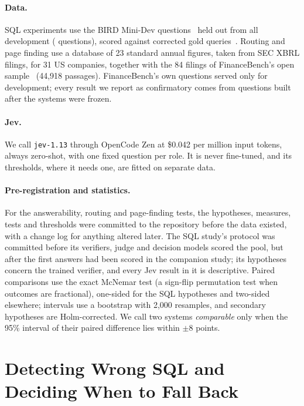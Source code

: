 \documentclass[runningheads,a4paper]{llncs}
\makeatletter
\newcommand{\N}[1]{\@ifundefined{pb@#1}{\textbf{??#1??}}{\csname pb@#1\endcsname}}
\makeatother
\begin{document}
\paragraph{Data.} SQL experiments use the BIRD Mini-Dev questions~\cite{li2023bird} held out from all development
(\N{sN} questions), scored against corrected gold queries~\cite{jin2026annotation}. Routing and page finding use a
database of 23 standard annual figures, taken from SEC XBRL filings, for 31 US companies, together with the 84
filings of FinanceBench's open sample~\cite{islam2023financebench} (44,918 passages). FinanceBench's own questions
served only for development; every result we report as confirmatory comes from questions built after the systems
were frozen.

\paragraph{Jev.} We call \texttt{jev-1.13} through OpenCode Zen at \$0.042 per million input tokens, always
zero-shot, with one fixed question per role. It is never fine-tuned, and its thresholds, where it needs one, are
fitted on separate data.

\paragraph{Pre-registration and statistics.} For the answerability, routing and page-finding tests, the hypotheses,
measures, tests and thresholds were committed to the repository before the data existed, with a change log for
anything altered later. The SQL study's protocol was committed before its verifiers, judge and decision models scored
the pool, but after the first answers had been scored in the companion study; its hypotheses concern the trained
verifier, and every Jev result in it is descriptive. Paired comparisons use the exact McNemar test (a sign-flip
permutation test when outcomes are fractional), one-sided for the SQL hypotheses and two-sided elsewhere; intervals
use a bootstrap with 2,000 resamples, and secondary hypotheses are Holm-corrected. We call two systems \emph{comparable}
only when the 95\% interval of their paired difference lies within $\pm$8 points.

\section{Detecting Wrong SQL and Deciding When to Fall Back}\label{sec:sql}
\end{document}
